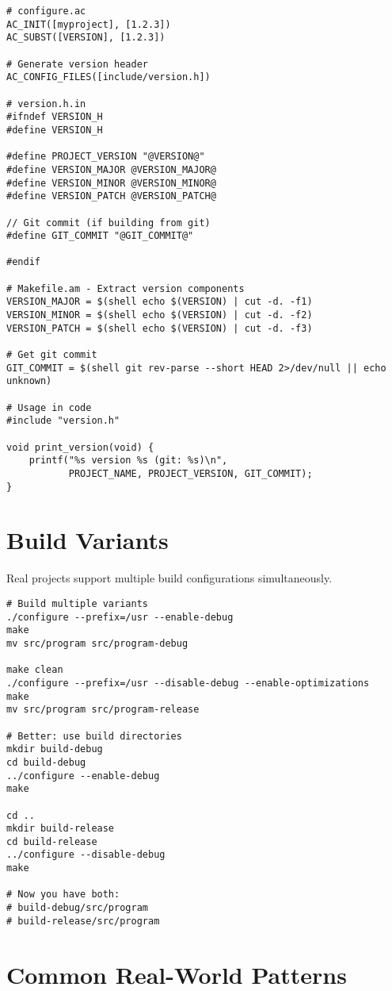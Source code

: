 \begin{lstlisting}
# configure.ac
AC_INIT([myproject], [1.2.3])
AC_SUBST([VERSION], [1.2.3])

# Generate version header
AC_CONFIG_FILES([include/version.h])

# version.h.in
#ifndef VERSION_H
#define VERSION_H

#define PROJECT_VERSION "@VERSION@"
#define VERSION_MAJOR @VERSION_MAJOR@
#define VERSION_MINOR @VERSION_MINOR@
#define VERSION_PATCH @VERSION_PATCH@

// Git commit (if building from git)
#define GIT_COMMIT "@GIT_COMMIT@"

#endif

# Makefile.am - Extract version components
VERSION_MAJOR = $(shell echo $(VERSION) | cut -d. -f1)
VERSION_MINOR = $(shell echo $(VERSION) | cut -d. -f2)
VERSION_PATCH = $(shell echo $(VERSION) | cut -d. -f3)

# Get git commit
GIT_COMMIT = $(shell git rev-parse --short HEAD 2>/dev/null || echo unknown)

# Usage in code
#include "version.h"

void print_version(void) {
    printf("%s version %s (git: %s)\n",
           PROJECT_NAME, PROJECT_VERSION, GIT_COMMIT);
}
\end{lstlisting}

\section{Build Variants}

Real projects support multiple build configurations simultaneously.

\begin{lstlisting}
# Build multiple variants
./configure --prefix=/usr --enable-debug
make
mv src/program src/program-debug

make clean
./configure --prefix=/usr --disable-debug --enable-optimizations
make
mv src/program src/program-release

# Better: use build directories
mkdir build-debug
cd build-debug
../configure --enable-debug
make

cd ..
mkdir build-release
cd build-release
../configure --disable-debug
make

# Now you have both:
# build-debug/src/program
# build-release/src/program
\end{lstlisting}

\section{Common Real-World Patterns}

